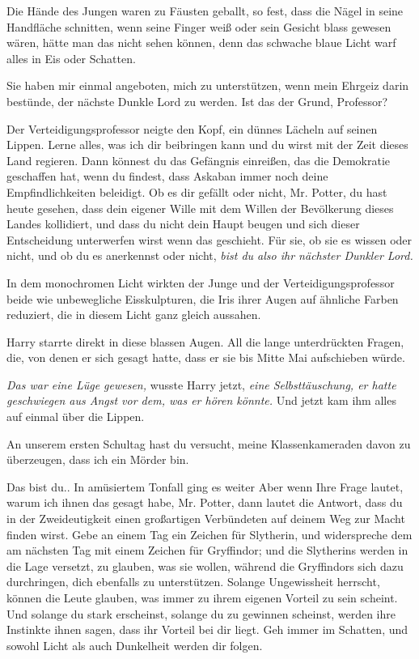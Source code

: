 Die Hände des Jungen waren zu Fäusten geballt, so fest, dass die Nägel in seine
Handfläche schnitten, wenn seine Finger weiß oder sein Gesicht blass gewesen
wären, hätte man das nicht sehen können, denn das schwache blaue Licht warf
alles in Eis oder Schatten.

\glqq Sie haben mir einmal angeboten, mich zu unterstützen, wenn mein Ehrgeiz
darin bestünde, der nächste Dunkle Lord zu werden. Ist das der Grund,
Professor?\grqq{}

Der Verteidigungsprofessor neigte den Kopf, ein dünnes Lächeln auf seinen
Lippen. \glqq Lerne alles, was ich dir beibringen kann und du wirst mit der Zeit
dieses Land regieren. Dann könnest du das Gefängnis einreißen, das die
Demokratie geschaffen hat, wenn du findest, dass Askaban immer noch deine
Empfindlichkeiten beleidigt. Ob es dir gefällt oder nicht, Mr. Potter, du hast
heute gesehen, dass dein eigener Wille mit dem Willen der Bevölkerung dieses
Landes kollidiert, und dass du nicht dein Haupt beugen und sich dieser
Entscheidung unterwerfen wirst wenn das geschieht. Für sie, ob sie es wissen
oder nicht, und ob du es anerkennst oder nicht,\emph{ bist du also ihr nächster
Dunkler Lord.}\grqq{}

In dem monochromen Licht wirkten der Junge und der Verteidigungsprofessor beide
wie unbewegliche Eisskulpturen, die Iris ihrer Augen auf ähnliche Farben
reduziert, die in diesem Licht ganz gleich aussahen.

Harry starrte direkt in diese blassen Augen. All die lange unterdrückten Fragen,
die, von denen er sich gesagt hatte, dass er sie bis Mitte Mai aufschieben
würde.

\emph{Das war eine Lüge gewesen,} wusste Harry jetzt, \emph{eine
Selbsttäuschung, er hatte geschwiegen aus Angst vor dem, was er hören könnte.}
Und jetzt kam ihm alles auf einmal über die Lippen.

\glqq An unserem ersten Schultag hast du versucht, meine Klassenkameraden davon
zu überzeugen, dass ich ein Mörder bin.\grqq{}

\glqq Das bist du.\grqq{}. In amüsiertem Tonfall ging es weiter \glqq Aber wenn
Ihre Frage lautet, warum ich ihnen das gesagt habe, Mr. Potter, dann lautet die
Antwort, dass du in der Zweideutigkeit einen großartigen Verbündeten auf deinem
Weg zur Macht finden wirst. Gebe an einem Tag ein Zeichen für Slytherin, und
widerspreche dem am nächsten Tag mit einem Zeichen für Gryffindor; und die
Slytherins werden in die Lage versetzt, zu glauben, was sie wollen, während die
Gryffindors sich dazu durchringen, dich ebenfalls zu unterstützen. Solange
Ungewissheit herrscht, können die Leute glauben, was immer zu ihrem eigenen
Vorteil zu sein scheint. Und solange du stark erscheinst, solange du zu gewinnen
scheinst, werden ihre Instinkte ihnen sagen, dass ihr Vorteil bei dir liegt. Geh
immer im Schatten, und sowohl Licht als auch Dunkelheit werden dir
folgen.\grqq{}


